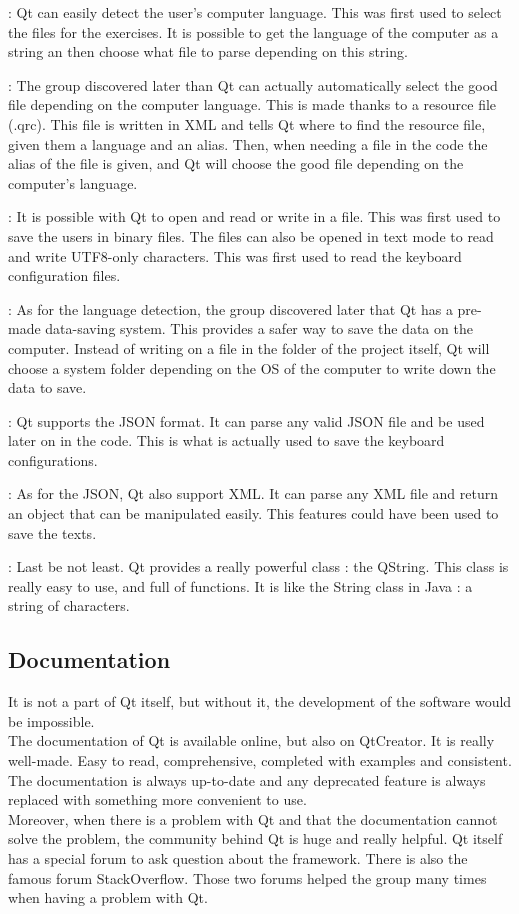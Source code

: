 \begin{description}[align=left]
	\item[Language detection] : Qt can easily detect the user's computer language. This was first used to select the files for the exercises. It is possible to get the language of the computer as a string an then choose what file to parse depending on this string.
	\item[Resources files] : The group discovered later than Qt can actually automatically select the good file depending on the computer language. This is made thanks to a resource file (.qrc). This file is written in XML and tells Qt where to find the resource file, given them a language and an alias. Then, when needing a file in the code the alias of the file is given, and Qt will choose the good file depending on the computer's language.
	\item[DataStream] : It is possible with Qt to open and read or write in a file. This was first used to save the users in binary files. The files can also be opened in text mode to read and write UTF8-only characters. This was first used to read the keyboard configuration files.
	\item[QSettings] : As for the language detection, the group discovered later that Qt has a pre-made data-saving system. This provides a safer way to save the data on the computer. Instead of writing on a file in the folder of the project itself, Qt will choose a system folder depending on the OS of the computer to write down the data to save.
	\item[Json] : Qt supports the JSON format. It can parse any valid JSON file and be used later on in the code. This is what is actually used to save the keyboard configurations. 
	\item[XML] : As for the JSON, Qt also support XML. It can parse any XML file and return an object that can be manipulated easily. This features could have been used to save the texts.
	\item[QString] : Last be not least. Qt provides a really powerful class : the QString. This class is really easy to use, and full of functions. It is like the String class in Java : a string of characters.
\end{description}

\subsection{Documentation}
It is not a part of Qt itself, but without it, the development of the software would be impossible.\\
The documentation of Qt is available online, but also on QtCreator. It is really well-made. Easy to read, comprehensive, completed with examples and consistent. The documentation is always up-to-date and any deprecated feature is always replaced with something more convenient to use.\\
Moreover, when there is a problem with Qt and that the documentation cannot solve the problem, the community behind Qt is huge and really helpful. Qt itself has a special forum to ask question about the framework. There is also the famous forum StackOverflow. Those two forums helped the group many times when having a problem with Qt.

